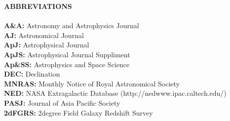 \thispagestyle{plain}
 \noindent
{\bf ABBREVIATIONS}\\
\\
{\bf A\&A:} Astronomy and Astrophysics Journal \\
{\bf AJ:} Astronomical Journal \\
{\bf ApJ:} Astrophysical Journal \\
{\bf ApJS:} Astrophysical Journal Suppliment \\
{\bf Ap\&SS:} Astrophysics and Space Science \\
{\bf DEC:} Declination\\
{\bf MNRAS:} Monthly Notice of Royal Astronomical Society \\
{\bf NED:} NASA Extragalactic Database (http://nedwww.ipac.caltech.edu/)\\
{\bf PASJ:} Journal of Asia Pacific Society\\
{\bf 2dFGRS:} 2degree Field Galaxy Redshift Survey \\
